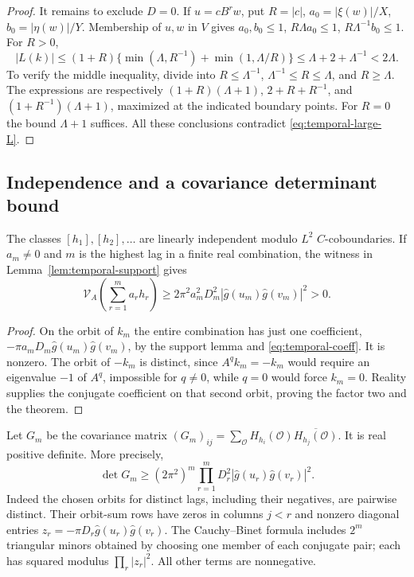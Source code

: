 \begin{proof}
It remains to exclude $D=0$. If $u=cB^rw$, put $R=|c|$,
$a_0=|\xi(w)|/X$, $b_0=|\eta(w)|/Y$.
Membership of $u,w$ in $V$ gives $a_0,b_0\le1$,
$R\Lambda a_0\le1$, $R\Lambda^{-1}b_0\le1$. For $R>0$,
\[
 |L(k)|\le(1+R)\{\min(\Lambda,R^{-1})+\min(1,\Lambda/R)\}
          \le\Lambda+2+\Lambda^{-1}<2\Lambda.
\]
To verify the middle inequality, divide into $R\le\Lambda^{-1}$,
$\Lambda^{-1}\le R\le\Lambda$, and $R\ge\Lambda$.
The expressions are respectively $(1+R)(\Lambda+1)$,
$2+R+R^{-1}$, and $(1+R^{-1})(\Lambda+1)$, maximized at the indicated
boundary points. For $R=0$ the bound $\Lambda+1$ suffices.
All these conclusions contradict \eqref{eq:temporal-large-L}.
\end{proof}

\subsection{Independence and a covariance determinant bound}
\begin{theorem}\label{thm:temporal-independent}
The classes $[h_1],[h_2],\ldots$ are linearly independent modulo $L^2$
$C$-coboundaries. If $a_m\ne0$ and $m$ is the highest lag in a finite real
combination, the witness in Lemma~\ref{lem:temporal-support} gives
\begin{equation}\label{eq:temporal-lower}
 \mathcal V_A\left(\sum_{r=1}^m a_rh_r\right)
 \ge2\pi^2a_m^2D_m^2
       |\widehat g(u_m)\widehat g(v_m)|^2>0.
\end{equation}
\end{theorem}
\begin{proof}
On the orbit of $k_m$ the entire combination has just one coefficient,
$-\pi a_mD_m\widehat g(u_m)\widehat g(v_m)$, by the support lemma and
\eqref{eq:temporal-coeff}. It is nonzero. The orbit of $-k_m$ is distinct,
since $A^qk_m=-k_m$ would require an eigenvalue $-1$ of $A^q$, impossible
for $q\ne0$, while $q=0$ would force $k_m=0$. Reality supplies the conjugate
coefficient on that second orbit, proving the factor two and the theorem.
\end{proof}

Let $G_m$ be the covariance matrix
$(G_m)_{ij}=\sum_{\mathcal O}H_{h_i}(\mathcal O)
\overline{H_{h_j}(\mathcal O)}$. It is real positive definite. More precisely,
\begin{equation}\label{eq:temporal-det}
 \det G_m\ge(2\pi^2)^m
       \prod_{r=1}^m D_r^2|\widehat g(u_r)\widehat g(v_r)|^2.
\end{equation}
Indeed the chosen orbits for distinct lags, including their negatives, are
pairwise distinct. Their orbit-sum rows have zeros in columns $j<r$ and
nonzero diagonal entries $z_r=-\pi D_r\widehat g(u_r)\widehat g(v_r)$.
The Cauchy--Binet formula includes $2^m$ triangular minors obtained by choosing
one member of each conjugate pair; each has squared modulus
$\prod_r|z_r|^2$. All other terms are nonnegative.

